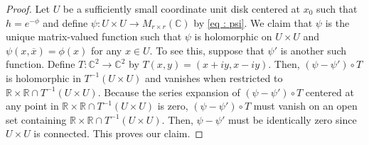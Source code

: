 \documentclass{amsart}
\theoremstyle{definition}
\theoremstyle{remark}
\numberwithin{equation}{section}
\begin{document}
\begin{proof}

Let $U$ be a sufficiently small coordinate unit disk centered at $x_0$ such that $h = e^{-\phi}$ and define $\psi : U \times U \to M_{r \times r}(\mathbb{C})$ by \eqref{eq : psi}. We claim that $\psi$ is the unique matrix-valued function such that $\psi$ is holomorphic on $U \times U$ and $\psi(x,\overline{x}) = \phi(x)$ for any $x \in U$. To see this, suppose that $\psi'$ is another such function. Define $T : \mathbb{C}^2 \to \mathbb{C}^2$ by $T(x,y) = (x+iy,x-iy)$. Then, $(\psi - \psi')\circ T$ is holomorphic in $T^{-1}(U \times U)$ and vanishes when restricted to $\mathbb{R}\times \mathbb{R} \cap T^{-1}(U \times U)$. Because the series expansion of $(\psi - \psi')\circ T$ centered at any point in $\mathbb{R} \times \mathbb{R} \cap T^{-1}(U \times U)$ is zero, $(\psi - \psi') \circ T$ must vanish on an open set containing $\mathbb{R}\times \mathbb{R} \cap T^{-1}(U \times U)$. Then, $\psi - \psi'$ must be identically zero since $U \times U$ is connected. This proves our claim.





\end{proof}
\end{document}
